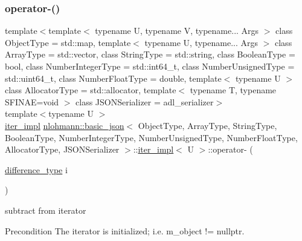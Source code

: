 \subsubsection{\texorpdfstring{operator-\/()}{operator-()}\hspace{0.1cm}{\footnotesize\ttfamily [1/2]}}
{\footnotesize\ttfamily template$<$template$<$ typename U, typename V, typename... Args $>$ class Object\+Type = std\+::map, template$<$ typename U, typename... Args $>$ class Array\+Type = std\+::vector, class String\+Type  = std\+::string, class Boolean\+Type  = bool, class Number\+Integer\+Type  = std\+::int64\+\_\+t, class Number\+Unsigned\+Type  = std\+::uint64\+\_\+t, class Number\+Float\+Type  = double, template$<$ typename U $>$ class Allocator\+Type = std\+::allocator, template$<$ typename T, typename S\+F\+I\+N\+A\+E=void $>$ class J\+S\+O\+N\+Serializer = adl\+\_\+serializer$>$ \\
template$<$typename U $>$ \\
\mbox{\hyperlink{classnlohmann_1_1basic__json_1_1iter__impl}{iter\+\_\+impl}} \mbox{\hyperlink{classnlohmann_1_1basic__json}{nlohmann\+::basic\+\_\+json}}$<$ Object\+Type, Array\+Type, String\+Type, Boolean\+Type, Number\+Integer\+Type, Number\+Unsigned\+Type, Number\+Float\+Type, Allocator\+Type, J\+S\+O\+N\+Serializer $>$\+::\mbox{\hyperlink{classnlohmann_1_1basic__json_1_1iter__impl}{iter\+\_\+impl}}$<$ U $>$\+::operator-\/ (\begin{DoxyParamCaption}\item[{\mbox{\hyperlink{classnlohmann_1_1basic__json_1_1iter__impl_aa3d908ee643e5938d32e5f6d261d7715}{difference\+\_\+type}}}]{i }\end{DoxyParamCaption})\hspace{0.3cm}{\ttfamily [inline]}}



subtract from iterator 

\begin{DoxyPrecond}{Precondition}
The iterator is initialized; i.\+e. {\ttfamily m\+\_\+object != nullptr}. 
\end{DoxyPrecond}
\mbox{\label{classnlohmann_1_1basic__json_1_1iter__impl_a3bedce4ada748251e86c7924be54e210}} 

